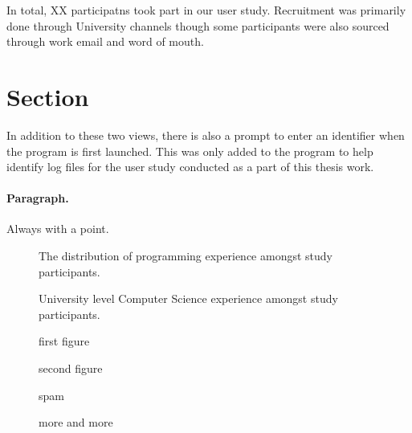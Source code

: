 In total, {XX} participatns took part in our user study. Recruitment was
primarily done through University channels though some participants were also
sourced through work email and word of mouth.




\section{Section} In addition to these two views, there is also a prompt to
enter an identifier when the program is first launched. This was only added to
the program to help identify log files for the user study conducted as a part
of this thesis work.

\paragraph{Paragraph.} Always with a point.


\begin{figure}[H]
	\centering
	\scalebox{0.75}{}
	\caption{The distribution of programming experience amongst study participants.}
	\label{fig:programmingexp}
\end{figure}

\begin{figure}[H]
	\centering
	\scalebox{0.8}{}
	\caption{University level Computer Science experience amongst study participants.}
	\label{fig:uniexp}
\end{figure}

\begin{figure}[H]
	\centering
	\begin{minipage}{0.45\textwidth}
		\centering
		\scalebox{0.7}{}
		\caption{first figure}
	\end{minipage}\hspace{-1em}
	\begin{minipage}{0.45\textwidth}
		\centering
		\scalebox{0.7}{}
		\caption{second figure}
	\end{minipage}
\end{figure}



\begin{figure}[H]
	\scalebox{0.72}{}
	\caption{spam}
	\label{fig:uniexp}
\end{figure}

\begin{figure}[H]
	\scalebox{0.72}{}
	\caption{more and more}
	\label{fig:moreandmore}
\end{figure}


